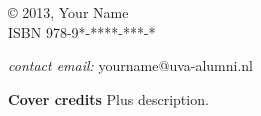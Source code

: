 
%
%

\pagestyle{empty}

\null  %
\vfill

\noindent
\copyright{} 2013, Your Name \\
ISBN 978-9*-****-***-*\\

\vspace{2mm}

\noindent
\textit{contact email:} yourname@uva-alumni.nl\\

\vspace{2mm}

\noindent
{\bf Cover credits} Plus description.

\cleardoublepage
\pagestyle{fancy}

